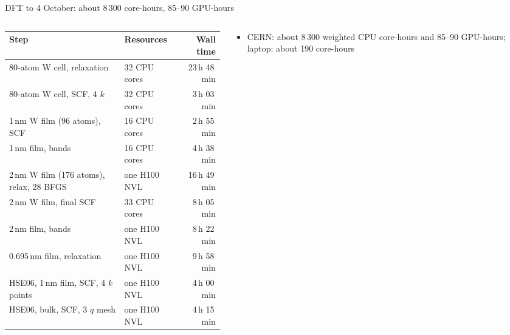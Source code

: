 \begin{frame}[t]{DFT to 4 October: about 8\,300 core-hours, 85--90 GPU-hours}
  \thirteenTop\thirteendense
  \begin{columns}[T,onlytextwidth]
    \begin{column}{0.545\textwidth}
      {\scriptsize\setlength{\tabcolsep}{3pt}
      \begin{tabular}{@{}llr@{}}
        \toprule
        Step & Resources & Wall time \\
        \midrule
        80-atom W cell, relaxation                 & 32 CPU cores   & 23\,h 48\,min \\
        80-atom W cell, SCF, 4\thirteenx4\thirteenx4 $k$ & 32 CPU cores & 3\,h 03\,min \\
        1\,nm W film (96 atoms), SCF               & 16 CPU cores   &  2\,h 55\,min \\
        1\,nm film, bands                          & 16 CPU cores   &  4\,h 38\,min \\
        2\,nm W film (176 atoms), relax, 28 BFGS   & one H100 NVL   & 16\,h 49\,min \\
        2\,nm W film, final SCF                    & 33 CPU cores   &  8\,h 05\,min \\
        2\,nm film, bands                          & one H100 NVL   &  8\,h 22\,min \\
        0.695\,nm film, relaxation                 & one H100 NVL   &  9\,h 58\,min \\
        HSE06, 1\,nm film, SCF, 4 $k$ points       & one H100 NVL   &  4\,h 00\,min \\
        HSE06, bulk, SCF, 3\thirteenx3\thirteenx3 $q$ mesh & one H100 NVL & 4\,h 15\,min \\
        \bottomrule
      \end{tabular}\par}
    \end{column}
    \begin{column}{0.425\textwidth}
      \begin{itemize}
        \item CERN: about 8\,300 weighted CPU core-hours and 85--90 GPU-hours; laptop: about 190 core-hours

\end{itemize}
\end{column}
\end{columns}
\end{frame}
